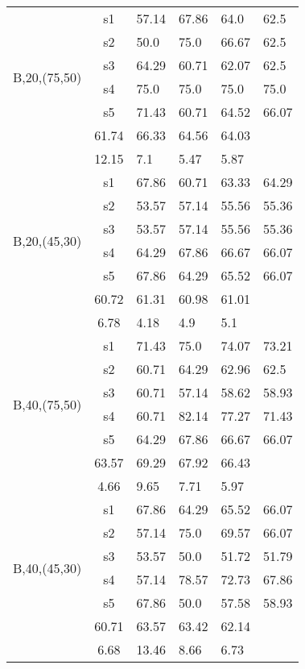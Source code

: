 \begin{table}[h]
{\begin{tabular}{cc|llll}
\multirow{6}{*}{\begin{sideways}B,20,(75,50)\end{sideways}} & s1 & 57.14 & 67.86 & 64.0 & 62.5 \\
 & s2 & 50.0 & 75.0 & 66.67 & 62.5 \\
 & s3 & 64.29 & 60.71 & 62.07 & 62.5 \\
 & s4 & 75.0 & 75.0 & 75.0 & 75.0 \\
 & s5 & 71.43 & 60.71 & 64.52 & 66.07 \\
\rowcolor{lightgray!50}\multicolumn{2}{r|}{avg} & 61.74 & 66.33 & 64.56 & 64.03 \\
\rowcolor{lightgray!50}\multicolumn{2}{r|}{std} & 12.15 & 7.1 & 5.47 & 5.87 \\
\multirow{6}{*}{\begin{sideways}B,20,(45,30)\end{sideways}} & s1 & 67.86 & 60.71 & 63.33 & 64.29 \\
 & s2 & 53.57 & 57.14 & 55.56 & 55.36 \\
 & s3 & 53.57 & 57.14 & 55.56 & 55.36 \\
 & s4 & 64.29 & 67.86 & 66.67 & 66.07 \\
 & s5 & 67.86 & 64.29 & 65.52 & 66.07 \\
\rowcolor{lightgray!50}\multicolumn{2}{r|}{avg} & 60.72 & 61.31 & 60.98 & 61.01 \\
\rowcolor{lightgray!50}\multicolumn{2}{r|}{std} & 6.78 & 4.18 & 4.9 & 5.1 \\
\multirow{6}{*}{\begin{sideways}B,40,(75,50)\end{sideways}} & s1 & 71.43 & 75.0 & 74.07 & 73.21 \\
 & s2 & 60.71 & 64.29 & 62.96 & 62.5 \\
 & s3 & 60.71 & 57.14 & 58.62 & 58.93 \\
 & s4 & 60.71 & 82.14 & 77.27 & 71.43 \\
 & s5 & 64.29 & 67.86 & 66.67 & 66.07 \\
\rowcolor{lightgray!50}\multicolumn{2}{r|}{avg} & 63.57 & 69.29 & 67.92 & 66.43 \\
\rowcolor{lightgray!50}\multicolumn{2}{r|}{std} & 4.66 & 9.65 & 7.71 & 5.97 \\
\multirow{6}{*}{\begin{sideways}B,40,(45,30)\end{sideways}} & s1 & 67.86 & 64.29 & 65.52 & 66.07 \\
 & s2 & 57.14 & 75.0 & 69.57 & 66.07 \\
 & s3 & 53.57 & 50.0 & 51.72 & 51.79 \\
 & s4 & 57.14 & 78.57 & 72.73 & 67.86 \\
 & s5 & 67.86 & 50.0 & 57.58 & 58.93 \\
\rowcolor{lightgray!50}\multicolumn{2}{r|}{avg} & 60.71 & 63.57 & 63.42 & 62.14 \\
\rowcolor{lightgray!50}\multicolumn{2}{r|}{std} & 6.68 & 13.46 & 8.66 & 6.73
\end{tabular}}
\end{table}


